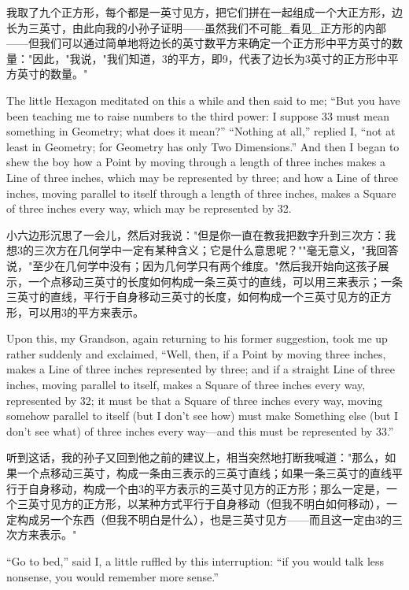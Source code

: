 \documentclass[12pt,UTF8]{ctexbook}
\begin{document}
我取了九个正方形，每个都是一英寸见方，把它们拼在一起组成一个大正方形，边长为三英寸，由此向我的小孙子证明——虽然我们不可能\_看见\_正方形的内部——但我们可以通过简单地将边长的英寸数平方来确定一个正方形中平方英寸的数量："因此，"我说，"我们知道，3的平方，即9，代表了边长为3英寸的正方形中平方英寸的数量。"

The little Hexagon meditated on this a while and then said to me; ``But you have been teaching me to raise numbers to the third power: I suppose 33 must mean something in Geometry; what does it mean?'' ``Nothing at all,'' replied I, ``not at least in Geometry; for Geometry has only Two Dimensions.'' And then I began to shew the boy how a Point by moving through a length of three inches makes a Line of three inches, which may be represented by three; and how a Line of three inches, moving parallel to itself through a length of three inches, makes a Square of three inches every way, which may be represented by 32.

小六边形沉思了一会儿，然后对我说："但是你一直在教我把数字升到三次方：我想3的三次方在几何学中一定有某种含义；它是什么意思呢？""毫无意义，"我回答说，"至少在几何学中没有；因为几何学只有两个维度。"然后我开始向这孩子展示，一个点移动三英寸的长度如何构成一条三英寸的直线，可以用三来表示；一条三英寸的直线，平行于自身移动三英寸的长度，如何构成一个三英寸见方的正方形，可以用3的平方来表示。

Upon this, my Grandson, again returning to his former suggestion, took me up rather suddenly and exclaimed, ``Well, then, if a Point by moving three inches, makes a Line of three inches represented by three; and if a straight Line of three inches, moving parallel to itself, makes a Square of three inches every way, represented by 32; it must be that a Square of three inches every way, moving somehow parallel to itself (but I don't see how) must make Something else (but I don't see what) of three inches every way---and this must be represented by 33.''

听到这话，我的孙子又回到他之前的建议上，相当突然地打断我喊道："那么，如果一个点移动三英寸，构成一条由三表示的三英寸直线；如果一条三英寸的直线平行于自身移动，构成一个由3的平方表示的三英寸见方的正方形；那么一定是，一个三英寸见方的正方形，以某种方式平行于自身移动（但我不明白如何移动），一定构成另一个东西（但我不明白是什么），也是三英寸见方——而且这一定由3的三次方来表示。"

``Go to bed,'' said I, a little ruffled by this interruption: ``if you would talk less nonsense, you would remember more sense.''
\end{document}
